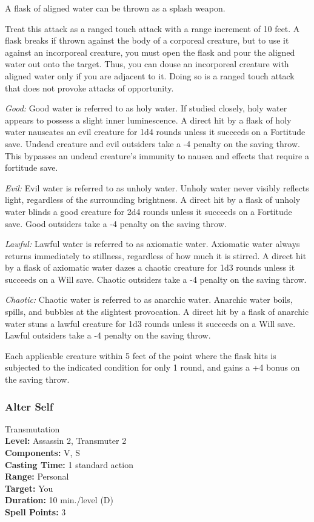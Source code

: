A flask of aligned water can be thrown as a splash weapon.

Treat this attack as a ranged touch attack with a range increment of 10 feet. 
A flask breaks if thrown against the body of a corporeal creature, but to use it against an incorporeal creature, you must open the flask and pour the aligned water out onto the target. 
Thus, you can douse an incorporeal creature with aligned water only if you are adjacent to it. 
Doing so is a ranged touch attack that does not provoke attacks of opportunity.
\begin{list}{}{\leftmargin=1em}
 \item \emph{Good:} Good water is referred to as holy water. 
 If studied closely, holy water appears to possess a slight inner luminescence.
 A direct hit by a flask of holy water nauseates an evil creature for 1d4 rounds unless it succeeds on a Fortitude save. 
 Undead creature and evil outsiders take a -4 penalty on the saving throw.
 This bypasses an undead creature's immunity to nausea and effects that require a fortitude save.
 \item \emph{Evil:} Evil water is referred to as unholy water. 
 Unholy water never visibly reflects light, regardless of the surrounding brightness.
 A direct hit by a flask of unholy water blinds a good creature for 2d4 rounds unless it succeeds on a Fortitude save. 
 Good outsiders take a -4 penalty on the saving throw.
 \item \emph{Lawful:} Lawful water is referred to as axiomatic water. 
 Axiomatic water always returns immediately to stillness, regardless of how much it is stirred.
 A direct hit by a flask of axiomatic water dazes a chaotic creature for 1d3 rounds unless it succeeds on a Will save. 
 Chaotic outsiders take a -4 penalty on the saving throw.
 \item \emph{Chaotic:} Chaotic water is referred to as anarchic water. 
 Anarchic water boils, spills, and bubbles at the slightest provocation.
 A direct hit by a flask of anarchic water stuns a lawful creature for 1d3 rounds unless it succeeds on a Will save. 
 Lawful outsiders take a -4 penalty on the saving throw.
\end{list} 
Each applicable creature within 5 feet of the point where the flask hits is subjected to the indicated condition for only 1 round, and gains a +4 bonus on the saving throw.
\subsubsection{Alter Self}
\label{Spell:AlterSelf}
Transmutation
\\ \textbf{Level:} Assassin 2, Transmuter 2
\\ \textbf{Components:} V, S
\\ \textbf{Casting Time:} 1 standard action
\\ \textbf{Range:} Personal
\\ \textbf{Target:} You
\\ \textbf{Duration:} 10 min./level (D)
\\ \textbf{Spell Points:} 3

